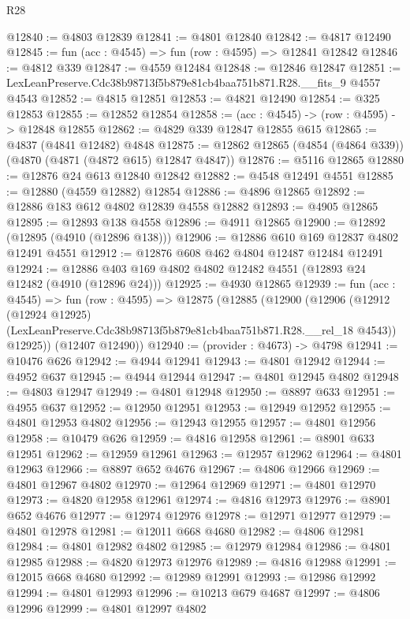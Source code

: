 \begin{lexlean}{R28}
\begin{coremodule}
@12840 := @4803 @12839
@12841 := @4801 @12840
@12842 := @4817 @12490
@12845 := fun (acc : @4545) => fun (row : @4595) => @12841 @12842
@12846 := @4812 @339
@12847 := @4559 @12484
@12848 := @12846 @12847
@12851 := LexLeanPreserve.Cdc38b98713f5b879e81cb4baa751b871.R28.__fits_9 @4557 @4543
@12852 := @4815 @12851
@12853 := @4821 @12490
@12854 := @325 @12853
@12855 := @12852 @12854
@12858 := (acc : @4545) -> (row : @4595) -> @12848 @12855
@12862 := @4829 @339 @12847 @12855 @615
@12865 := @4837 (@4841 @12482) @4848
@12875 := @12862 @12865 (@4854 (@4864 @339)) (@4870 (@4871 (@4872 @615) @12847 @4847))
@12876 := @5116 @12865
@12880 := @12876 @24 @613 @12840 @12842
@12882 := @4548 @12491 @4551
@12885 := @12880 (@4559 @12882) @12854
@12886 := @4896 @12865
@12892 := @12886 @183 @612 @4802 @12839 @4558 @12882
@12893 := @4905 @12865
@12895 := @12893 @138 @4558
@12896 := @4911 @12865
@12900 := @12892 (@12895 (@4910 (@12896 @138)))
@12906 := @12886 @610 @169 @12837 @4802 @12491 @4551
@12912 := @12876 @608 @462 @4804 @12487 @12484 @12491
@12924 := @12886 @403 @169 @4802 @4802 @12482 @4551 (@12893 @24 @12482 (@4910 (@12896 @24)))
@12925 := @4930 @12865
@12939 := fun (acc : @4545) =>
  fun (row : @4595) =>
  @12875
    (@12885
      (@12900
        (@12906
          (@12912
            (@12924 @12925)
            (LexLeanPreserve.Cdc38b98713f5b879e81cb4baa751b871.R28.__rel_18 @4543))
          @12925))
      (@12407 @12490))
@12940 := (provider : @4673) -> @4798
@12941 := @10476 @626
@12942 := @4944 @12941
@12943 := @4801 @12942
@12944 := @4952 @637
@12945 := @4944 @12944
@12947 := @4801 @12945 @4802
@12948 := @4803 @12947
@12949 := @4801 @12948
@12950 := @8897 @633
@12951 := @4955 @637
@12952 := @12950 @12951
@12953 := @12949 @12952
@12955 := @4801 @12953 @4802
@12956 := @12943 @12955
@12957 := @4801 @12956
@12958 := @10479 @626
@12959 := @4816 @12958
@12961 := @8901 @633 @12951
@12962 := @12959 @12961
@12963 := @12957 @12962
@12964 := @4801 @12963
@12966 := @8897 @652 @4676
@12967 := @4806 @12966
@12969 := @4801 @12967 @4802
@12970 := @12964 @12969
@12971 := @4801 @12970
@12973 := @4820 @12958 @12961
@12974 := @4816 @12973
@12976 := @8901 @652 @4676
@12977 := @12974 @12976
@12978 := @12971 @12977
@12979 := @4801 @12978
@12981 := @12011 @668 @4680
@12982 := @4806 @12981
@12984 := @4801 @12982 @4802
@12985 := @12979 @12984
@12986 := @4801 @12985
@12988 := @4820 @12973 @12976
@12989 := @4816 @12988
@12991 := @12015 @668 @4680
@12992 := @12989 @12991
@12993 := @12986 @12992
@12994 := @4801 @12993
@12996 := @10213 @679 @4687
@12997 := @4806 @12996
@12999 := @4801 @12997 @4802

\end{coremodule}
\end{lexlean}
